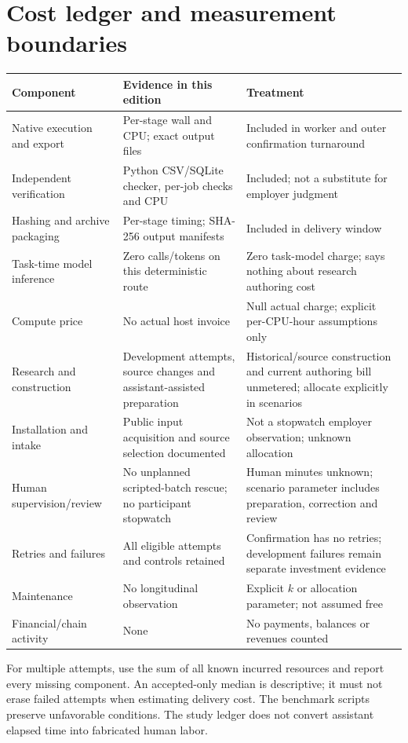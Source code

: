 \documentclass[11pt,a4paper]{article}
\begin{document}
\clearpage
\appendix
\section{Cost ledger and measurement boundaries}
\begin{longtable}{P{.26\linewidth}P{.28\linewidth}P{.37\linewidth}}
\toprule Component & Evidence in this edition & Treatment\\\midrule\endhead
Native execution and export & Per-stage wall and CPU; exact output files & Included in worker and outer confirmation turnaround\\
Independent verification & Python CSV/SQLite checker, per-job checks and CPU & Included; not a substitute for employer judgment\\
Hashing and archive packaging & Per-stage timing; SHA-256 output manifests & Included in delivery window\\
Task-time model inference & Zero calls/tokens on this deterministic route & Zero task-model charge; says nothing about research authoring cost\\
Compute price & No actual host invoice & Null actual charge; explicit per-CPU-hour assumptions only\\
Research and construction & Development attempts, source changes and assistant-assisted preparation & Historical/source construction and current authoring bill unmetered; allocate explicitly in scenarios\\
Installation and intake & Public input acquisition and source selection documented & Not a stopwatch employer observation; unknown allocation\\
Human supervision/review & No unplanned scripted-batch rescue; no participant stopwatch & Human minutes unknown; scenario parameter includes preparation, correction and review\\
Retries and failures & All eligible attempts and controls retained & Confirmation has no retries; development failures remain separate investment evidence\\
Maintenance & No longitudinal observation & Explicit $k$ or allocation parameter; not assumed free\\
Financial/chain activity & None & No payments, balances or revenues counted\\
\bottomrule
\end{longtable}
For multiple attempts, use the sum of all known incurred resources and report every missing component. An accepted-only median is descriptive; it must not erase failed attempts when estimating delivery cost. The benchmark scripts preserve unfavorable conditions. The study ledger does not convert assistant elapsed time into fabricated human labor.
\end{document}
